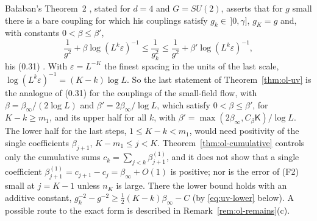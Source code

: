 Ba\l aban's Theorem~2 \cite{BalYM4I}, stated for $d=4$ and $G=SU(2)$, asserts that for $g$ small there is a bare coupling for which his couplings satisfy $g_k\in\,]0,\gamma]$, $g_K=g$ and, with constants $0<\beta\le\beta'$,
\[
\frac1{g^2}+\beta\log(L^k\varepsilon)^{-1}\le\frac1{g_k^2}\le\frac1{g^2}+\beta'\log(L^k\varepsilon)^{-1},
\]
his (0.31) \cite[p.~259]{BalYM4I}. With $\varepsilon=L^{-K}$ the finest spacing in the units of the last scale, $\log(L^k\varepsilon)^{-1}=(K-k)\log L$. So the last statement of Theorem~\ref{thm:ol-uv} is the analogue of (0.31) for the couplings of the small-field flow, with $\beta=\beta_\infty/(2\log L)$ and $\beta'=2\beta_\infty/\log L$, which satisfy $0<\beta\le\beta'$, for $K-k\ge m_1$, and its upper half for all $k$, with $\beta'=\max(2\beta_\infty,C_\beta\mathsf K)/\log L$. The lower half for the last steps, $1\le K-k<m_1$, would need positivity of the single coefficients $\beta_{j+1}$, $K-m_1\le j<K$. Theorem~\ref{thm:ol-cumulative} controls only the cumulative sums $c_k=\sum_{j<k}\beta^{(1)}_{j+1}$, and it does not show that a single coefficient $\beta^{(1)}_{j+1}=c_{j+1}-c_j=\beta_\infty+O(1)$ is positive; nor is the error of (F2) small at $j=K-1$ unless $n_K$ is large. There the lower bound holds with an additive constant, $g_k^{-2}-g^{-2}\ge\frac12(K-k)\beta_\infty-C$ (by \eqref{eq:uv-lower} below). A possible route to the exact form is described in Remark~\ref{rem:ol-remains}(c).

